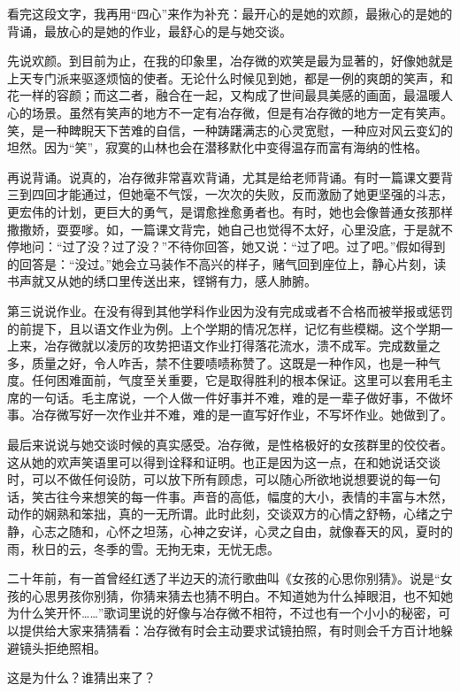 \documentclass[openany]{ctexbook}
\begin{document}
看完这段文字，我再用``四心''来作为补充：最开心的是她的欢颜，最揪心的是她的背诵，最放心的是她的作业，最舒心的是与她交谈。

先说欢颜。到目前为止，在我的印象里，冶存微的欢笑是最为显著的，好像她就是上天专门派来驱逐烦恼的使者。无论什么时候见到她，都是一例的爽朗的笑声，和花一样的容颜；而这二者，融合在一起，又构成了世间最具美感的画面，最温暖人心的场景。虽然有笑声的地方不一定有冶存微，但是有冶存微的地方一定有笑声。笑，是一种睥睨天下苦难的自信，一种踌躇满志的心灵宽慰，一种应对风云变幻的坦然。因为``笑''，寂寞的山林也会在潜移默化中变得温存而富有海纳的性格。

再说背诵。说真的，冶存微非常喜欢背诵，尤其是给老师背诵。有时一篇课文要背三到四回才能通过，但她毫不气馁，一次次的失败，反而激励了她更坚强的斗志，更宏伟的计划，更巨大的勇气，是谓愈挫愈勇者也。有时，她也会像普通女孩那样撒撒娇，耍耍嗲。如，一篇课文背完，她自己也觉得不太好，心里没底，于是就不停地问：``过了没？过了没？''不待你回答，她又说：``过了吧。过了吧。''假如得到的回答是：``没过。''她会立马装作不高兴的样子，赌气回到座位上，静心片刻，读书声就又从她的绣口里传送出来，铿锵有力，感人肺腑。

第三说说作业。在没有得到其他学科作业因为没有完成或者不合格而被举报或惩罚的前提下，且以语文作业为例。上个学期的情况怎样，记忆有些模糊。这个学期一上来，冶存微就以凌厉的攻势把语文作业打得落花流水，溃不成军。完成数量之多，质量之好，令人咋舌，禁不住要啧啧称赞了。这既是一种作风，也是一种气度。任何困难面前，气度至关重要，它是取得胜利的根本保证。这里可以套用毛主席的一句话。毛主席说，一个人做一件好事并不难，难的是一辈子做好事，不做坏事。冶存微写好一次作业并不难，难的是一直写好作业，不写坏作业。她做到了。

最后来说说与她交谈时候的真实感受。冶存微，是性格极好的女孩群里的佼佼者。这从她的欢声笑语里可以得到诠释和证明。也正是因为这一点，在和她说话交谈时，可以不做任何设防，可以放下所有顾虑，可以随心所欲地说想要说的每一句话，笑古往今来想笑的每一件事。声音的高低，幅度的大小，表情的丰富与木然，动作的娴熟和笨拙，真的一无所谓。此时此刻，交谈双方的心情之舒畅，心绪之宁静，心志之随和，心怀之坦荡，心神之安详，心灵之自由，就像春天的风，夏时的雨，秋日的云，冬季的雪。无拘无束，无忧无虑。

二十年前，有一首曾经红透了半边天的流行歌曲叫《女孩的心思你别猜》。说是``女孩的心思男孩你别猜，你猜来猜去也猜不明白。不知道她为什么掉眼泪，也不知她为什么笑开怀\ldots{}\ldots{}''歌词里说的好像与冶存微不相符，不过也有一个小小的秘密，可以提供给大家来猜猜看：冶存微有时会主动要求试镜拍照，有时则会千方百计地躲避镜头拒绝照相。

这是为什么？谁猜出来了？
\end{document}

